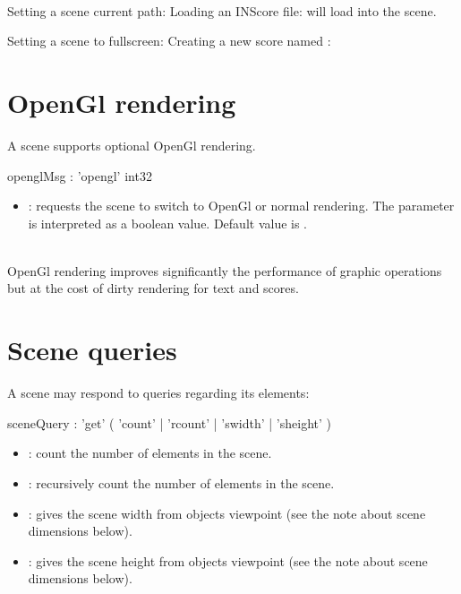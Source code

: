 \documentclass[a4paper,twoside]{report}
\newcommand{\sublevel}[1]	{\section{#1}}
\newcommand{\sampleindent}	{ \hspace{0.5cm} }
\begin{document}
\example \\
Setting a scene current path:
Loading an INScore file:
\sampleindent will load  into the scene. 

Setting a scene to fullscreen:
Creating a new score named :

\sublevel{OpenGl rendering}
\label{opengl}
A scene supports optional OpenGl rendering.


\begin{rail}
openglMsg :  'opengl' int32
\end{rail}

\begin{itemize}
\item {}: requests the scene to switch to OpenGl or normal rendering.  The parameter is interpreted as a boolean value. Default value is . 
\end{itemize}

\note \\
OpenGl rendering improves significantly the performance of graphic operations but at the cost of dirty rendering for text and scores.

\sublevel{Scene queries}
\label{scenequery}

A scene may respond to queries regarding its elements:


\begin{rail}
sceneQuery : 'get' ( 'count'
					| 'rcount'
					| 'swidth'
					| 'sheight' )
\end{rail}

\begin{itemize}
\item {}: count the number of elements in the scene.
\item {}: recursively count the number of elements in the scene.
\item {}: gives the scene width from objects viewpoint (see the note about scene dimensions below).
\item {}: gives the scene height from objects viewpoint (see the note about scene dimensions below).
\end{itemize}
\end{document}
